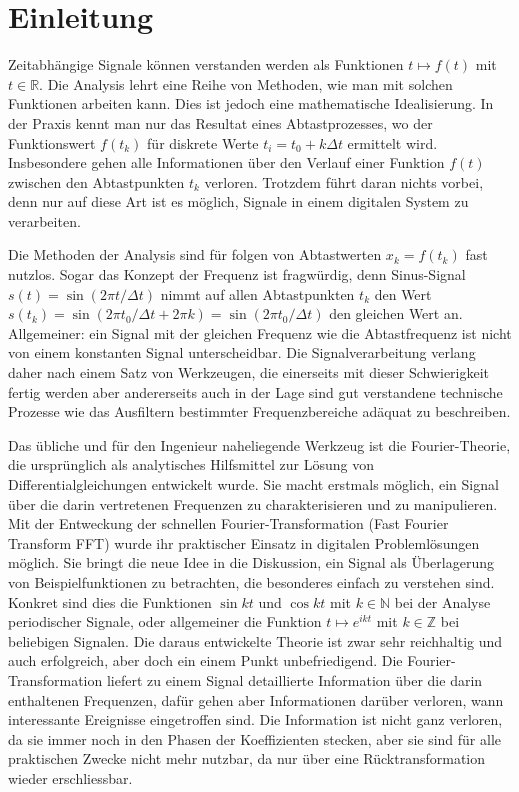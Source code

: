 %
%
%
\chapter*{Einleitung\label{chapter:einleitung}}
Zeitabhängige Signale können verstanden werden als Funktionen $t\mapsto f(t)$
mit $t\in\mathbb R$.
Die Analysis lehrt eine Reihe von Methoden, wie man mit solchen
Funktionen arbeiten kann.
Dies ist jedoch eine mathematische Idealisierung.
In der Praxis kennt man nur das Resultat eines Abtastprozesses, wo
der Funktionswert $f(t_k)$ für diskrete Werte $t_i=t_0 + k\Delta t$
ermittelt wird.
Insbesondere gehen alle Informationen über den Verlauf einer Funktion $f(t)$
zwischen den Abtastpunkten $t_k$ verloren.
Trotzdem führt daran nichts vorbei, denn nur auf diese Art ist es möglich,
Signale in einem digitalen System zu verarbeiten.

Die Methoden der Analysis sind für folgen von Abtastwerten $x_k=f(t_k)$
fast nutzlos.
Sogar das Konzept der Frequenz ist fragwürdig, denn Sinus-Signal
$s(t)=\sin(2\pi t/\Delta t)$ nimmt auf allen Abtastpunkten $t_k$
den Wert $s(t_k)=\sin(2\pi t_0/\Delta t+2\pi k)=\sin(2\pi t_0/\Delta t)$
den gleichen Wert an.
Allgemeiner: ein Signal mit der gleichen Frequenz wie die Abtastfrequenz
ist nicht von einem konstanten Signal unterscheidbar.
Die Signalverarbeitung verlang daher nach einem Satz von Werkzeugen, die
einerseits mit dieser Schwierigkeit fertig werden aber andererseits auch
in der Lage sind gut verstandene technische Prozesse wie das Ausfiltern
bestimmter Frequenzbereiche adäquat zu beschreiben.

Das übliche und für den Ingenieur naheliegende Werkzeug ist die 
Fourier-Theorie, die ursprünglich als analytisches Hilfsmittel zur Lösung
von Differentialgleichungen entwickelt wurde.
Sie macht erstmals möglich, ein Signal über die darin vertretenen
Frequenzen zu charakterisieren und zu manipulieren.
Mit der Entweckung der schnellen Fourier-Transformation
(Fast Fourier Transform FFT) wurde ihr praktischer Einsatz in digitalen
Problemlösungen möglich.
Sie bringt die neue Idee in die Diskussion, ein Signal als Überlagerung
von Beispielfunktionen zu betrachten, die besonderes einfach zu
verstehen sind.
Konkret sind dies die Funktionen $\sin kt$ und $\cos kt$ mit
$k\in\mathbb N$ bei der Analyse periodischer Signale,
oder allgemeiner die Funktion $t\mapsto e^{ikt}$ mit $k\in\mathbb Z$
bei beliebigen Signalen.
Die daraus entwickelte Theorie ist zwar sehr reichhaltig und auch erfolgreich,
aber doch ein einem Punkt unbefriedigend.
Die Fourier-Transformation liefert zu einem Signal detaillierte Information
über die darin enthaltenen Frequenzen, dafür gehen aber Informationen
darüber verloren, wann interessante Ereignisse eingetroffen sind.
Die Information ist nicht ganz verloren, da sie immer noch in den Phasen
der Koeffizienten stecken, aber sie sind für alle praktischen Zwecke 
nicht mehr nutzbar, da nur über eine Rücktransformation wieder erschliessbar.

